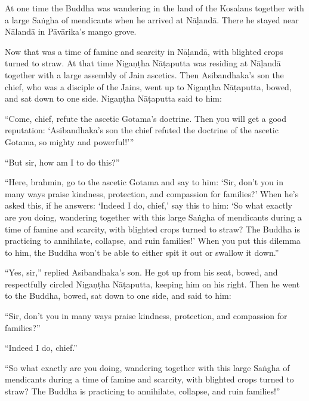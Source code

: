 \documentclass[12pt,openany]{book}%
\begin{document}
At one time the Buddha was wandering in the land of the Kosalans together with a large \textsanskrit{Saṅgha} of mendicants when he arrived at \textsanskrit{Nāḷandā}. There he stayed near \textsanskrit{Nālandā} in \textsanskrit{Pāvārika}’s mango grove. 

Now that was a time of famine and scarcity in \textsanskrit{Nāḷandā}, with blighted crops turned to straw. At that time \textsanskrit{Nigaṇṭha} \textsanskrit{Nāṭaputta} was residing at \textsanskrit{Nāḷandā} together with a large assembly of Jain ascetics. Then Asibandhaka’s son the chief, who was a disciple of the Jains, went up to \textsanskrit{Nigaṇṭha} \textsanskrit{Nāṭaputta}, bowed, and sat down to one side. \textsanskrit{Nigaṇṭha} \textsanskrit{Nāṭaputta} said to him: 

“Come, chief, refute the ascetic Gotama’s doctrine. Then you will get a good reputation: ‘Asibandhaka’s son the chief refuted the doctrine of the ascetic Gotama, so mighty and powerful!’” 

“But sir, how am I to do this?” 

“Here, brahmin, go to the ascetic Gotama and say to him: ‘Sir, don’t you in many ways praise kindness, protection, and compassion for families?’ When he’s asked this, if he answers: ‘Indeed I do, chief,’ say this to him: ‘So what exactly are you doing, wandering together with this large \textsanskrit{Saṅgha} of mendicants during a time of famine and scarcity, with blighted crops turned to straw? The Buddha is practicing to annihilate, collapse, and ruin families!’ When you put this dilemma to him, the Buddha won’t be able to either spit it out or swallow it down.” 

“Yes, sir,” replied Asibandhaka’s son. He got up from his seat, bowed, and respectfully circled \textsanskrit{Nigaṇṭha} \textsanskrit{Nāṭaputta}, keeping him on his right. Then he went to the Buddha, bowed, sat down to one side, and said to him: 

“Sir, don’t you in many ways praise kindness, protection, and compassion for families?” 

“Indeed I do, chief.” 

“So what exactly are you doing, wandering together with this large \textsanskrit{Saṅgha} of mendicants during a time of famine and scarcity, with blighted crops turned to straw? The Buddha is practicing to annihilate, collapse, and ruin families!” 
\end{document}
